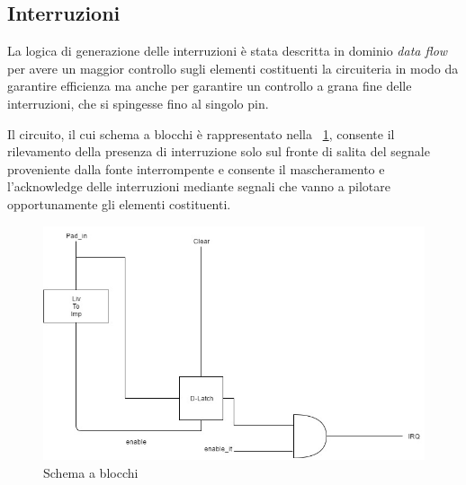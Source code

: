\documentclass[12pt,a4paper,twoside,openany]{book}
\begin{document}
\subsection*{Interruzioni}
La logica di generazione delle interruzioni è stata descritta in dominio \textit{data flow} per avere un maggior controllo sugli elementi costituenti la circuiteria in modo da garantire efficienza ma anche per garantire un controllo a grana fine delle interruzioni, che si spingesse fino al singolo pin.

Il circuito, il cui schema a blocchi è rappresentato nella \figurename~\ref{gpio_schema_blocchi}, consente il rilevamento della presenza di interruzione solo sul fronte di salita del segnale proveniente dalla fonte interrompente e consente il mascheramento e l'acknowledge delle interruzioni mediante segnali che vanno a pilotare opportunamente gli elementi costituenti.
\begin{figure}[hb]
\includegraphics[scale=0.55, keepaspectratio]{immagini/gpio_intgen_schema_blocchi}
\caption{Schema a blocchi}
\label{gpio_schema_blocchi}
\end{figure}
\end{document}
